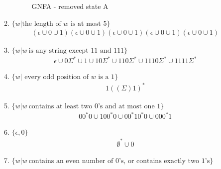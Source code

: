 \begin{enumerate}
\begin{enumerate}
                    \begin{figure}[H]
                        \centering
                        \caption{GNFA - removed state A}
                    \end{figure}
              \item $\{w|\text{the length of }w\text{ is at most }5\}$
                    \begin{align*}
                        (\epsilon \cup 0 \cup 1)(\epsilon \cup 0 \cup 1)(\epsilon \cup 0 \cup 1)(\epsilon \cup 0 \cup 1)(\epsilon \cup 0 \cup 1)
                    \end{align*}
              \item $\{w|w~ \text{is any string except }11\text{ and }111\}$
                    \begin{align*}
                        \epsilon \cup 0\Sigma^\ast \cup 1 \cup 10\Sigma^\ast \cup 110\Sigma^\ast \cup 1110\Sigma^\ast \cup 1111\Sigma^\ast
                    \end{align*}
              \item $\{w|\text{ every odd position of }w\text{ is a }1\}$
                    \begin{align*}
                        1((\Sigma)1)^*
                    \end{align*}
              \item $\{w|w~ \text{contains at least two }0\text{'s and at most one }1\}$
                    \begin{align*}
                        00^\ast0 \cup 100^\ast0 \cup 00^\ast10^\ast0 \cup 000^\ast1
                    \end{align*}
              \item $\{\epsilon,0\}$
                    \begin{align*}
                        \emptyset^\ast \cup 0
                    \end{align*}
              \item $\{w|w~ \text{contains an even number of }0\text{'s, or contains exactly two }1\text{'s}\}$

\end{enumerate}
\end{enumerate}

